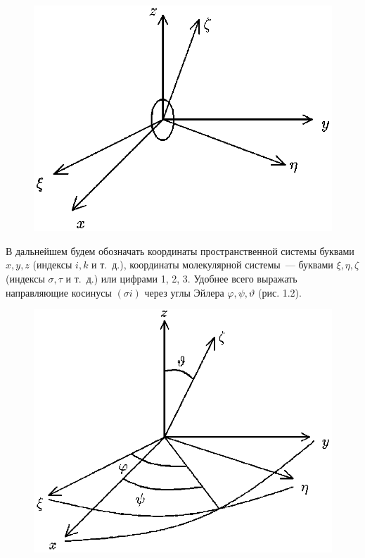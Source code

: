\begin{figure}[tbp]
\centerline{\hbox{\includegraphics[scale=0.7]{Ris/ris_eps/ris1_01.eps}}}

\end{figure}

В дальнейшем будем обозначать координаты пространственной системы
буквами $x,y,z$ (индексы $i,k$ и т.~д.), координаты молекулярной
системы~--- буквами $\xi,\eta,\zeta$ (индексы $\sigma,\tau$ и
т.~д.) или цифрами 1, 2, 3. Удобнее всего выражать направляющие
косинусы $(\sigma i)$ через углы Эйлера $\varphi,\psi,\vartheta$
(рис. 1.2).\vskip -2mm

\begin{figure}[tbp]
\centerline{\hbox{\includegraphics[scale=0.75]{Ris/ris_eps/ris1_02.eps}}}

\end{figure}
 
